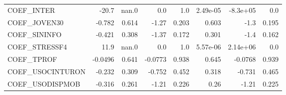 \begin{tabular}{lrrrrrrr}
COEF\_INTER       &    -20.7 &    nan.0 &     0.0 &      1.0 &      2.49e-05 &     -8.3e+05 &           0.0 \\
COEF\_JOVEN30     &   -0.782 &    0.614 &   -1.27 &    0.203 &         0.603 &         -1.3 &         0.195 \\
COEF\_SININFO     &   -0.421 &    0.308 &   -1.37 &    0.172 &         0.301 &         -1.4 &         0.162 \\
COEF\_STRESSF4    &     11.9 &    nan.0 &     0.0 &      1.0 &      5.57e-06 &     2.14e+06 &           0.0 \\
COEF\_TPROF       &  -0.0496 &    0.641 & -0.0773 &    0.938 &         0.645 &      -0.0768 &         0.939 \\
COEF\_USOCINTURON &   -0.232 &    0.309 &  -0.752 &    0.452 &         0.318 &       -0.731 &         0.465 \\
COEF\_USODISPMOB  &   -0.316 &    0.261 &   -1.21 &    0.226 &          0.26 &        -1.21 &         0.225 \\
\bottomrule
\end{tabular}

